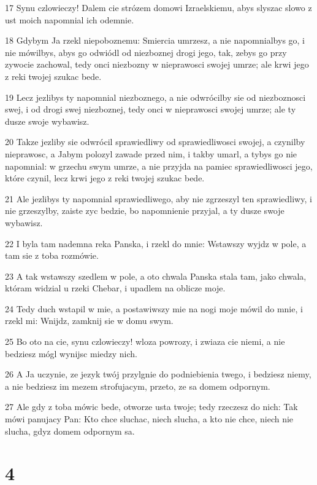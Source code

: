 \par 17 Synu czlowieczy! Dalem cie strózem domowi Izraelskiemu, abys slyszac slowo z ust moich napomnial ich odemnie.
\par 18 Gdybym Ja rzekl niepoboznemu: Smiercia umrzesz, a nie napomnialbys go, i nie mówilbys, abys go odwiódl od niezboznej drogi jego, tak, zebys go przy zywocie zachowal, tedy onci niezbozny w nieprawosci swojej umrze; ale krwi jego z reki twojej szukac bede.
\par 19 Lecz jezlibys ty napomnial niezboznego, a nie odwrócilby sie od niezboznosci swej, i od drogi swej niezboznej, tedy onci w nieprawosci swojej umrze; ale ty dusze swoje wybawisz.
\par 20 Takze jezliby sie odwrócil sprawiedliwy od sprawiedliwosci swojej, a czynilby nieprawosc, a Jabym polozyl zawade przed nim, i takby umarl, a tybys go nie napomnial: w grzechu swym umrze, a nie przyjda na pamiec sprawiedliwosci jego, które czynil, lecz krwi jego z reki twojej szukac bede.
\par 21 Ale jezlibys ty napomnial sprawiedliwego, aby nie zgrzeszyl ten sprawiedliwy, i nie grzeszylby, zaiste zyc bedzie, bo napomnienie przyjal, a ty dusze swoje wybawisz.
\par 22 I byla tam nademna reka Panska, i rzekl do mnie: Wstawszy wyjdz w pole, a tam sie z toba rozmówie.
\par 23 A tak wstawszy szedlem w pole, a oto chwala Panska stala tam, jako chwala, któram widzial u rzeki Chebar, i upadlem na oblicze moje.
\par 24 Tedy duch wstapil w mie, a postawiwszy mie na nogi moje mówil do mnie, i rzekl mi: Wnijdz, zamknij sie w domu swym.
\par 25 Bo oto na cie, synu czlowieczy! wloza powrozy, i zwiaza cie niemi, a nie bedziesz mógl wynijsc miedzy nich.
\par 26 A Ja uczynie, ze jezyk twój przylgnie do podniebienia twego, i bedziesz niemy, a nie bedziesz im mezem strofujacym, przeto, ze sa domem odpornym.
\par 27 Ale gdy z toba mówic bede, otworze usta twoje; tedy rzeczesz do nich: Tak mówi panujacy Pan: Kto chce sluchac, niech slucha, a kto nie chce, niech nie slucha, gdyz domem odpornym sa.

\chapter{4}

